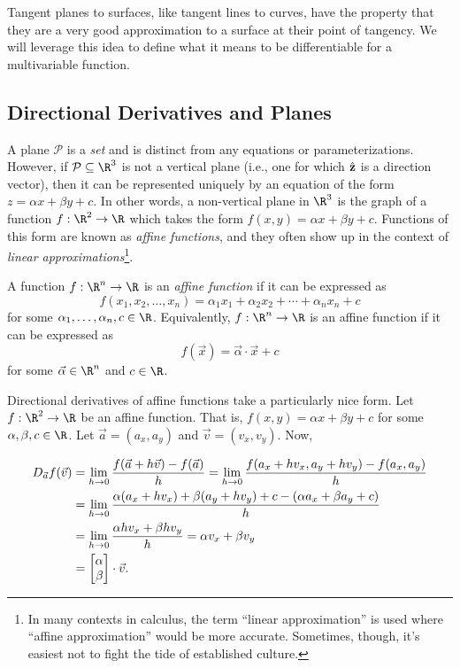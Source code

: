 Tangent planes to surfaces, like tangent lines to curves, have
the property that they are a very good approximation to a surface
at their point of tangency.  We will leverage this idea to 
define what it means to be differentiable for a multivariable function.

\subsection{Directional Derivatives and Planes}

A plane $\mathcal P$ is a \emph{set} and is distinct from any equations
or parameterizations.  However, if $\mathcal P\subseteq \R^3$ is not a vertical
plane (i.e., one for which ${\hat {\mathbf z}}$ is a direction vector), then it can be represented
uniquely by an equation of the form $z=\alpha x+\beta y+c$.  In other words,
a non-vertical plane in $\R^3$ is the graph of a function $f:\R^2\to\R$
which takes the form $f(x,y)=\alpha x+\beta y+c$.  Functions of this form
are known as \emph{affine functions}, and they
often show up in the context of \emph{linear approximations}\footnote{
	In many contexts in calculus, the term ``linear approximation'' is used
	where ``affine approximation'' would be more accurate.  Sometimes, though,
	it's easiest not to fight the tide of established culture.}.
\label{SECAFFINE}
\begin{definition}
	A function $f:\R^n\to\R$ is an \emph{affine function} if it can
	be expressed as
	\[
		f(x_1,x_2,\ldots,x_n) = \alpha_1x_1+\alpha_2x_2+\cdots+\alpha_nx_n +c
	\]
	for some $\alpha_1,\ldots,\alpha_n,c\in\R$.  Equivalently, $f:\R^n\to\R$ is
	an affine function if it can be expressed as
	\[
		f(\vec x)=\vec \alpha \cdot \vec x+c
	\]
	for some $\vec\alpha\in\R^n$ and $c\in \R$.
\end{definition}


Directional derivatives of affine functions take a particularly nice form.
Let $f:\R^2\to\R$ be an affine function.
That is, $f(x,y)=\alpha x+\beta y+c$ for some $\alpha,\beta,c\in\R$. 
Let $\vec a=(a_x,a_y)$ and $\vec v=(v_x,v_y)$.  Now,

\begin{align*}
	D_{\vec a}f(\vec v) &= \lim_{h\to0}\frac{f(\vec a+h\vec v)-f(\vec a)}{h}
	=\lim_{h\to0}\frac{f(a_x+hv_x, a_y+hv_y)-f(a_x,a_y)}{h}\\
	&=\lim_{h\to0}\frac{\alpha(a_x+hv_x)+\beta( a_y+hv_y)+c-(\alpha a_x+\beta a_y+c)}{h}\\
	&=\lim_{h\to0}\frac{\alpha hv_x+\beta hv_y}{h} = \alpha v_x+\beta v_y\\
	&=\mat{\alpha\\\beta}\cdot \vec v.
\end{align*}

